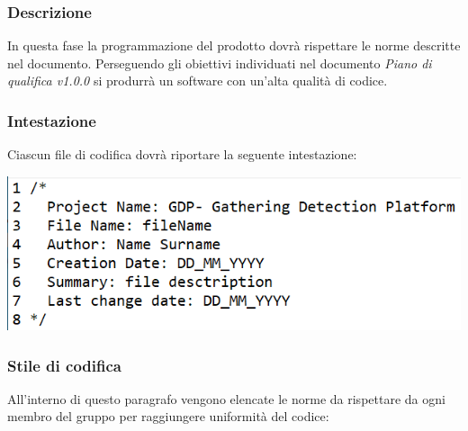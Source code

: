 \subsubsection{Descrizione}\label{ProcessiPrimariCodificaDescrizione}
In questa fase la programmazione del prodotto dovrà rispettare le norme descritte nel documento. Perseguendo gli obiettivi individuati nel documento \textit{Piano di qualifica v1.0.0} si produrrà un software con un'alta qualità di codice.

\subsubsection{Intestazione} \label{ProcessiPrimariCodificaIntestazione}
Ciascun file di codifica dovrà riportare la seguente intestazione: 
\begin{center}
	\includegraphics[width=0.5\linewidth]{../immagini/CodificaIdentazione.png}
\end{center}


\subsubsection{Stile di codifica}\label{ProcessiPrimariCodificaStileDiCodifica}
All'interno di questo paragrafo vengono elencate le norme da rispettare da ogni membro del gruppo per raggiungere uniformità del codice:

